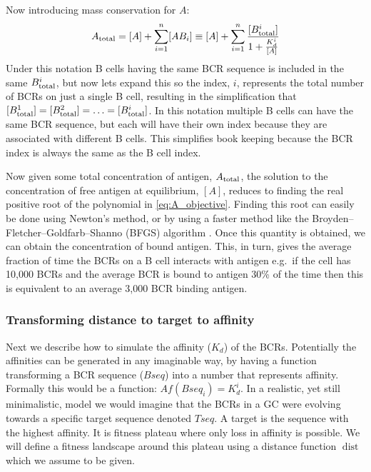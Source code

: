 \noindent
Now introducing mass conservation for $A$:
\begin{equation}
A_{\text{total}} = [A] + \sum_{i=1}^{n} [AB_i] \equiv [A] + \sum_{i=1}^{n} \frac{[B^i_{\text{total}}]}{1 + \frac{K^i_d}{[A]}}
  \label{eq:A_objective}
\end{equation}
Under this notation B cells having the same BCR sequence is included in the same $B^i_{\text{total}}$, but now lets expand this so the index, $i$, represents the total number of BCRs on just a single B cell, resulting in the simplification that $[B^1_{\text{total}}] = [B^2_{\text{total}}] = \ldots = [B^i_{\text{total}}]$.
In this notation multiple B cells can have the same BCR sequence, but each will have their own index because they are associated with different B cells.
This simplifies book keeping because the BCR index is always the same as the B cell index.

Now given some total concentration of antigen, $A_{\text{total}}$, the solution to the concentration of free antigen at equilibrium, $[A]$, reduces to finding the real positive root of the polynomial in \eqref{eq:A_objective}.
Finding this root can easily be done using Newton's method, or by using a faster method like the Broyden–Fletcher–Goldfarb–Shanno (BFGS) algorithm \cite{shanno1985broyden}.
Once this quantity is obtained, we can obtain the concentration of bound antigen.
This, in turn, gives the average fraction of time the BCRs on a B cell interacts with antigen e.g.\ if the cell has 10,000 BCRs and the average BCR is bound to antigen 30\% of the time then this is equivalent to an average 3,000 BCR binding antigen.




\subsubsection{Transforming distance to target to affinity}
Next we describe how to simulate the affinity ($K_d$) of the BCRs.
Potentially the affinities can be generated in any imaginable way, by having a function transforming a BCR sequence ($Bseq$) into a number that represents affinity.
Formally this would be a function: $Af(Bseq_i) = K^i_d$.
In a realistic, yet still minimalistic, model we would imagine that the BCRs in a GC were evolving towards a specific target sequence denoted $Tseq$.
A target is the sequence with the highest affinity.
It is fitness plateau where only loss in affinity is possible.
We will define a fitness landscape around this plateau using a distance function $\operatorname{dist}$ which we assume to be given.

